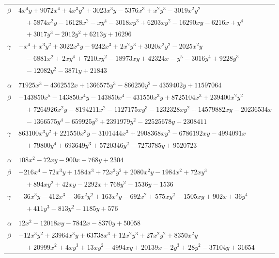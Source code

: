 \documentclass[11pt]{article}
\begin{document}
\begin{longtable}{@{}ll@{}}
$\beta$ & $4x^{4}y+9072x^{4}+4x^{3}y^{2}+3023x^{3}y-5376x^{3}+x^{2}y^{3}-3019x^{2}y^{2}$\\
 & $\quad +5874x^{2}y-16128x^{2}-xy^{4}-3018xy^{3}+6203xy^{2}-16290xy-6216x+y^{4}$\\
 & $\quad +3017y^{3}-2012y^{2}+6213y+16296$\\
$\gamma$ & $-x^{4}+x^{3}y^{2}+3022x^{3}y-9242x^{3}+2x^{2}y^{3}+3020x^{2}y^{2}-2025x^{2}y$\\
 & $\quad -6881x^{2}+2xy^{4}+7210xy^{2}-18973xy+42324x-y^{5}-3016y^{4}+9228y^{3}$\\
 & $\quad -12082y^{2}-3871y+21843$\\
\addlinespace[3pt]
\multicolumn{2}{@{}l}{$\{i,j\}=\{12,85\}$, $k_{ij}=2^{9}\cdot 3^{4}\cdot 5\cdot 7\cdot 19$}\\
$\alpha$ & $71925x^{3}-4362552x+1366575y^{3}-866250y^{2}-4359402y+11597064$\\
$\beta$ & $-143850x^{5}-143850x^{4}y-143850x^{4}-431550x^{3}y+8725104x^{3}+239400x^{2}y^{2}$\\
 & $\quad +7264926x^{2}y-8194211x^{2}-1127175xy^{3}-1232328xy^{2}+14579882xy-20236534x$\\
 & $\quad -1366575y^{4}-659925y^{3}+2391979y^{2}-22525678y+2308411$\\
$\gamma$ & $863100x^{3}y^{2}+221550x^{3}y-3101444x^{3}+2908368xy^{2}-6786192xy-4994091x$\\
 & $\quad +79800y^{4}+693649y^{3}+5720346y^{2}-7273785y+9520723$\\
\addlinespace[3pt]
\multicolumn{2}{@{}l}{$\{i,j\}=\{12,115\}$, $k_{ij}=2^{8}\cdot 3\cdot 7$}\\
$\alpha$ & $108x^{2}-72xy-900x-768y+2304$\\
$\beta$ & $-216x^{4}-72x^{3}y+1584x^{3}+72x^{2}y^{2}+2080x^{2}y-1984x^{2}+72xy^{3}$\\
 & $\quad +894xy^{2}+42xy-2292x+768y^{2}-1536y-1536$\\
$\gamma$ & $-36x^{3}y-412x^{3}-36x^{2}y^{2}+163x^{2}y-692x^{2}+575xy^{2}-1505xy+902x+36y^{4}$\\
 & $\quad +411y^{3}-813y^{2}-1185y+576$\\
\addlinespace[3pt]
\multicolumn{2}{@{}l}{$\{i,j\}=\{12,131\}$, $k_{ij}=2^{7}\cdot 3\cdot 5\cdot 7\cdot 13$}\\
$\alpha$ & $12x^{2}-12018xy-7842x-8370y+50058$\\
$\beta$ & $-12x^{3}y^{2}+23964x^{3}y+63738x^{3}+12x^{2}y^{3}+27x^{2}y^{2}+8350x^{2}y$\\
 & $\quad +20999x^{2}+4xy^{3}+13xy^{2}-4994xy+20139x-2y^{3}+28y^{2}-37104y+31654$\\

\end{longtable}
\end{document}

